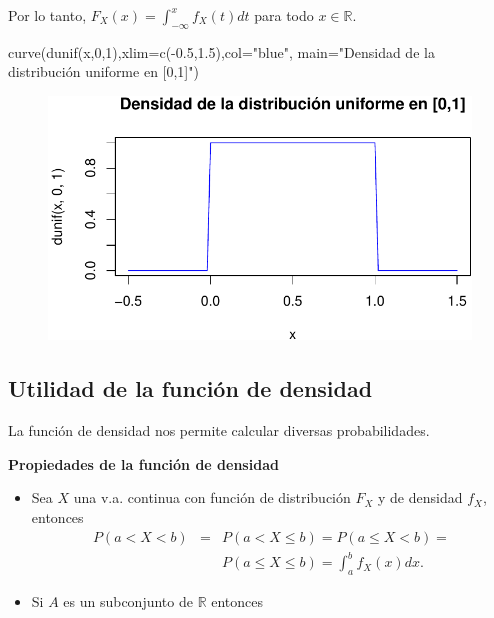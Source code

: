 \documentclass[
  letterpaper,
  DIV=11,
  numbers=noendperiod]{scrreprt}
\newenvironment{Shaded}{\begin{snugshade}}{\end{snugshade}}
\newcommand{\AttributeTok}[1]{\textcolor[rgb]{0.40,0.45,0.13}{#1}}
\newcommand{\DecValTok}[1]{\textcolor[rgb]{0.68,0.00,0.00}{#1}}
\newcommand{\FloatTok}[1]{\textcolor[rgb]{0.68,0.00,0.00}{#1}}
\newcommand{\FunctionTok}[1]{\textcolor[rgb]{0.28,0.35,0.67}{#1}}
\newcommand{\NormalTok}[1]{\textcolor[rgb]{0.00,0.23,0.31}{#1}}
\newcommand{\SpecialCharTok}[1]{\textcolor[rgb]{0.37,0.37,0.37}{#1}}
\newcommand{\StringTok}[1]{\textcolor[rgb]{0.13,0.47,0.30}{#1}}
\begin{document}
Por lo tanto, \(F_X(x)=\displaystyle\int_{-\infty}^x f_X(t) dt\) para
todo \(x\in\mathbb{R}.\)

\begin{Shaded}
\begin{Highlighting}[]
\FunctionTok{curve}\NormalTok{(}\FunctionTok{dunif}\NormalTok{(x,}\DecValTok{0}\NormalTok{,}\DecValTok{1}\NormalTok{),}\AttributeTok{xlim=}\FunctionTok{c}\NormalTok{(}\SpecialCharTok{{-}}\FloatTok{0.5}\NormalTok{,}\FloatTok{1.5}\NormalTok{),}\AttributeTok{col=}\StringTok{"blue"}\NormalTok{,}
      \AttributeTok{main=}\StringTok{"Densidad de la distribución uniforme en [0,1]"}\NormalTok{)}
\end{Highlighting}
\end{Shaded}

\begin{figure}[H]

{\centering \includegraphics{2_files/figure-pdf/unnamed-chunk-1-1.pdf}

}

\end{figure}

\hypertarget{utilidad-de-la-funciuxf3n-de-densidad}{%
\subsection{Utilidad de la función de
densidad}\label{utilidad-de-la-funciuxf3n-de-densidad}}

La función de densidad nos permite calcular diversas probabilidades.

\textbf{Propiedades de la función de densidad}

\begin{itemize}
\item
  Sea \(X\) una v.a. continua con función de distribución \(F_X\) y de
  densidad \(f_X\), entonces \begin{eqnarray*}
  P(a< X< b) &=&  P(a<X\leq b)= P(a\leq X< b)=\\
   & & P(a\leq X\leq b)= \displaystyle\int_{a}^b f_X(x) dx.
  \end{eqnarray*}
\item
  Si \(A\) es un subconjunto de \(\mathbb{R}\) entonces
\end{itemize}
\end{document}
